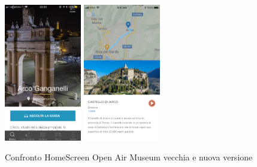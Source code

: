 \begin{figure}[h]
\centering
\includegraphics[width=0.3\textwidth]{images/screenSantarcangelo1.jpg}
\includegraphics[width=0.3\textwidth]{images/singolopunto.png}
\caption{Confronto HomeScreen Open Air Museum vecchia e nuova versione}
\end{figure}
\vspace{5mm}

